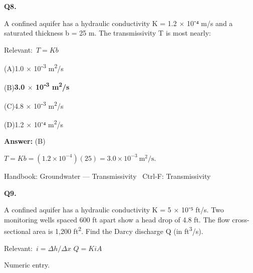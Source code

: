 \documentclass[11pt]{article}
\newcommand{\correct}[1]{\textbf{#1}\;{\color{accent}$\checkmark$}}
\newcommand{\optline}[2]{\par\noindent\hspace{1.2em}(#1)\hspace{0.6em}#2}
\begin{document}
\vspace{9pt}
\filbreak
\textbf{\color{accent}Q8.}\par\vspace{2pt}
A confined aquifer has a hydraulic conductivity K = 1.2 $\times$ 10⁻⁴ m/s and a saturated thickness b = 25 m. The transmissivity T is most nearly:\par\vspace{3pt}
{\small\color{soft}Relevant:}\ $T = Kb$\par\vspace{3pt}
\optline{A}{1.0 $\times$ 10⁻\textsuperscript{3} m\textsuperscript{2}/s}
\optline{B}{\correct{3.0 $\times$ 10⁻\textsuperscript{3} m\textsuperscript{2}/s}}
\optline{C}{4.8 $\times$ 10⁻\textsuperscript{3} m\textsuperscript{2}/s}
\optline{D}{1.2 $\times$ 10⁻⁴ m\textsuperscript{2}/s}
\par\vspace{3pt}
\vspace{2pt}\par\noindent\colorbox{boxbg}{\parbox{\dimexpr\linewidth-2\fboxsep\relax}{%
\vspace{2pt}\textbf{Answer:} (B)\par\vspace{2pt}
{\small $T = Kb = (1.2\times10^{-4})(25) = 3.0\times10^{-3}\ \mathrm{m^2/s}$.}\par\vspace{2pt}
{\footnotesize\color{soft}Handbook: Groundwater --- Transmissivity \textbullet\ Ctrl-F: Transmissivity}\vspace{2pt}
}}
\vspace{9pt}
\filbreak
\textbf{\color{accent}Q9.}\par\vspace{2pt}
A confined aquifer has a hydraulic conductivity K = 5 $\times$ 10⁻⁵ ft/s. Two monitoring wells spaced 600 ft apart show a head drop of 4.8 ft. The flow cross-sectional area is 1,200 ft\textsuperscript{2}. Find the Darcy discharge Q (in ft\textsuperscript{3}/s).\par\vspace{3pt}
{\small\color{soft}Relevant:}\ $i = \Delta h / \Delta x$ \quad $Q = KiA$\par\vspace{3pt}
{\small\color{soft}Numeric entry.}\par\vspace{3pt}
\end{document}
